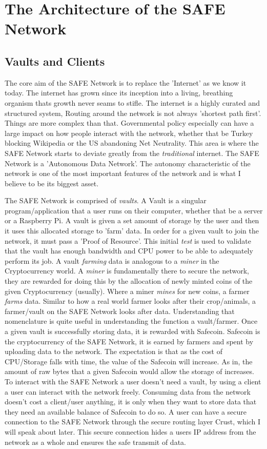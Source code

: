 \documentclass{l4proj}
\begin{document}
\chapter{The Architecture of the SAFE Network}
\label{ch:architecture}

\section{Vaults and Clients}

The core aim of the SAFE Network is to replace the 'Internet' as we know it today. The internet has grown since its inception into a living, breathing organism thats growth never seams to stifle. The internet is a highly curated and structured system, Routing around the network is not always 'shortest path first'. Things are more complex than that. Governmental policy especially can have a large impact on how people interact with the network, whether that be Turkey blocking Wikipedia or the US abandoning Net Neutrality. This area is where the SAFE Network starts to deviate greatly from the \textit{traditional} internet. The SAFE Network is a 'Autonomous Data Network'. The autonomy characteristic of the network is one of the most important features of the network and is what I believe to be its biggest asset.

The SAFE Network is comprised of \textit{vaults}. A Vault is a singular program/application that a user runs on their computer, whether that be a server or a Raspberry Pi. A vault is given a set amount of storage by the user and then it uses this allocated storage to 'farm' data. In order for a given vault to join the network, it must pass a 'Proof of Resource'. This initial \textit{test} is used to validate that the vault has enough bandwidth and CPU power to be able to adequately perform its job. A vault \textit{farming} data is analogous to a \textit{miner} in the Cryptocurrency world. A \textit{miner} is fundamentally there to secure the network, they are rewarded for doing this by the allocation of newly minted coins of the given Cryptocurrency (usually). Where a miner \textit{mines} for new coins, a farmer \textit{farms} data. Similar to how a real world farmer looks after their crop/animals, a farmer/vault on the SAFE Network looks after data. Understanding that nomenclature is quite useful in understanding the function a vault/farmer. Once a given vault is successfully storing data, it is rewarded with Safecoin. Safecoin is the cryptocurrency of the SAFE Network, it is earned by farmers and spent by uploading data to the network. The expectation is that as the cost of CPU/Storage falls with time, the value of the Safecoin will increase. As in, the amount of raw bytes that a given Safecoin would allow the storage of increases. To interact with the SAFE Network a user doesn't need a vault, by using a client a user can interact with the network freely. Consuming data from the network doesn't cost a client/user anything, it is only when they want to store data that they need an available balance of Safecoin to do so. A user can have a secure connection to the SAFE Network through the secure routing layer Crust, which I will speak about later. This secure connection hides a users IP address from the network as a whole and ensures the safe transmit of data.
\end{document}
